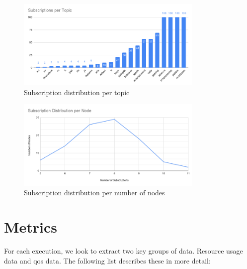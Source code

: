 \begin{figure}[!htb]
  \centering
  \includegraphics[width=0.8\textwidth]{img/subscriptions-per-topic.png}
  \caption{Subscription distribution per topic}
  \label{fig:subscriptions-per-topic}
\end{figure}

\begin{figure}[!htb]
  \centering
  \includegraphics[width=0.8\textwidth]{img/subscription-distribution-per-node.png}
  \caption{Subscription distribution per number of nodes}
  \label{fig:subscription-distribution-per-node}
\end{figure}

\section{Metrics}\label{metrics}

For each execution, we look to extract two key groups of data. Resource usage
data and \acrshort{qos} data. The following list describes these in more detail:

